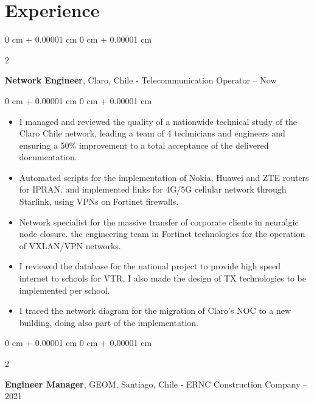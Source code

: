 \documentclass[10pt, letterpaper]{article}
\newenvironment{highlights}{
    \begin{itemize}[
        topsep=0.10 cm,
        parsep=0.10 cm,
        partopsep=0pt,
        itemsep=0pt,
        leftmargin=0 cm + 10pt
    ]
}{
    \end{itemize}
} %
\newenvironment{onecolentry}{
    \begin{adjustwidth}{
        0 cm + 0.00001 cm
    }{
        0 cm + 0.00001 cm
    }
}{
    \end{adjustwidth}
} %
\newenvironment{twocolentry}[2][]{
    \onecolentry
    \def\secondColumn{#2}
    \setcolumnwidth{\fill, 4.5 cm}
    \begin{paracol}{2}
}{
    \switchcolumn \raggedleft \secondColumn
    \end{paracol}
    \endonecolentry
} %
\begin{document}
\section{Experience}



        
        \begin{twocolentry}{
         2022 – Now
        }
            \textbf{Network Engineer}, Claro, Chile - Telecommunication Operator\end{twocolentry}

        \vspace{0.10 cm}
        \begin{onecolentry}
            \begin{highlights}
                \item I managed and reviewed the quality of a nationwide technical study of the Claro Chile network, leading a team of 4 technicians and engineers and ensuring a 50\% improvement to a total acceptance of the delivered documentation.
                \item Automated scripts for the implementation of Nokia, Huawei and ZTE routers for IPRAN.
                \Designed and implemented links for 4G/5G cellular network through Starlink, using VPNs on Fortinet firewalls.
                \item Network specialist for the massive transfer of corporate clients in neuralgic node closure.
                \Trained the engineering team in Fortinet technologies for the operation of VXLAN/VPN networks.
                \item I reviewed the database for the national project to provide high speed internet to schools for VTR, I also made the design of TX technologies to be implemented per school.
                \item I traced the network diagram for the migration of Claro's NOC to a new building, doing also part of the implementation.
            \end{highlights}
        \end{onecolentry}


        \vspace{0.2 cm}

        \begin{twocolentry}{
         2020 – 2021
        }
            \textbf{Engineer Manager}, GEOM, Santiago, Chile - ERNC Construction Company\end{twocolentry}
\end{document}
